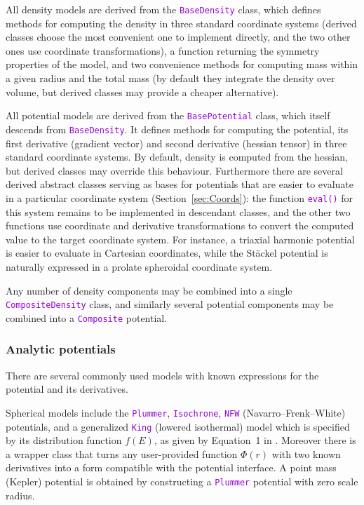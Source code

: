 \documentclass[12pt]{article}
\newcommand{\ttt}[1]{\textcolor{darkviolet}{\texttt{#1}}}
\begin{document}
All density models are derived from the \ttt{BaseDensity} class, which defines methods for computing the density in three standard coordinate systems (derived classes choose the most convenient one to implement directly, and the two other ones use coordinate transformations), a function returning the symmetry properties of the model, and two convenience methods for computing mass within a given radius and the total mass (by default they integrate the density over volume, but derived classes may provide a cheaper alternative).

All potential models are derived from the \ttt{BasePotential} class, which itself descends from \ttt{BaseDensity}. It defines methods for computing the potential, its first derivative (gradient vector) and second derivative (hessian tensor) in three standard coordinate systems. By default, density is computed from the hessian, but derived classes may override this behaviour.
Furthermore there are several derived abstract classes serving as bases for potentials that are easier to evaluate in a particular coordinate system (Section~\ref{sec:Coords}): the function \ttt{eval()} for this system remains to be implemented in descendant classes, and the other two functions use coordinate and derivative transformations to convert the computed value to the target coordinate system.
For instance, a triaxial harmonic potential is easier to evaluate in Cartesian coordinates, while the St\"ackel potential is naturally expressed in a prolate spheroidal coordinate system.

Any number of density components may be combined into a single \ttt{CompositeDensity} class, and similarly several potential components may be combined into a \ttt{Composite} potential.


\subsubsection{Analytic potentials}  \label{sec:PotentialAnalytic}

There are several commonly used models with known expressions for the potential and its derivatives. 

Spherical models include the \ttt{Plummer}, \ttt{Isochrone}, \ttt{NFW} (Navarro--Frenk--White) potentials, and a generalized \ttt{King} (lowered isothermal) model which is specified by its distribution function $f(E)$, as given by Equation~1 in \cite{GielesZocchi2015}.
Moreover there is a wrapper class that turns any user-provided function $\Phi(r)$ with two known derivatives into a form compatible with the potential interface. A point mass (Kepler) potential is obtained by constructing a \ttt{Plummer} potential with zero scale radius.
\end{document}
